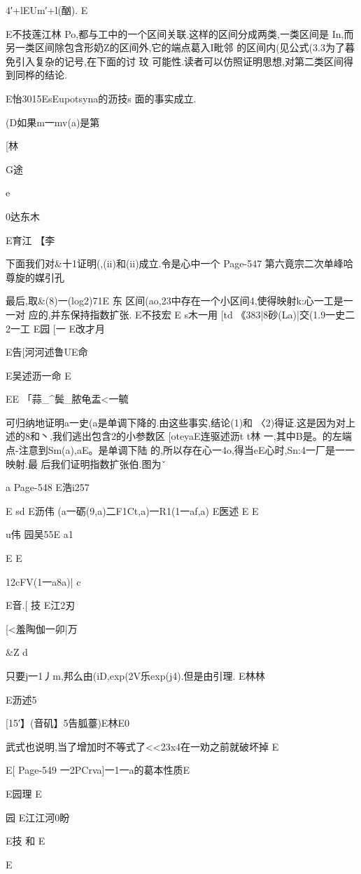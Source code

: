 {{4′+lEUm′+l(酗).
E

E不技莲江林
Po,都与工中的一个区间关联.这样的区间分成两类,一类区间是
In,而另一类区间除包含形奶Z的区间外,它的端点葛入I毗邻
的区间内(见公式(3.3为了暮免引入复杂的记号,在下面的讨
玟
可能性.读者可以仿照证明思想,对第二类区间得到同桦的结论.

E怡3015EsEupotsyna的沥技s
面的事实成立.

(D如果m一mv(a)是第%

[林

G途

e

0达东木

E育江
【李

下面我们对&十1证明(,(ii)和(ii)成立.令是心中一个
Page-547
第六竟宗二次单峰哈尊旋的媒引孔

最后,取&(8)一(log2)71E
东
区间(ao,23中存在一个小区间4,使得映射k:心一工是一一对
应的,并东保持指数扩张.
E不技宏
E
s木一用
[td
《383|8砂(La)|交(1.9一史二2一工
E园
[一
E改才月

E告[河河述鲁UE命

E吴述沥一命
E

EE
「蒜_^鬓_脓龟盂<一毓

可归纳地证明a一史(a是单调下降的.由这些事实,结论(1)和
〈2)得证.这是因为对上述的8和丶,我们逃出包含2的小参数区
[oteyaE连驱述沥t
t林
一,其中B是。的左端点-注意到Sm(a),aE。是单调下陆
的,所以存在心一4o,得当eE心时,Sn:4一厂是一一映射.最
后我们证明指数扩张伯.图为ˇ

a
Page-548
E浩i257

E
sd
E沥伟
(a一砺(9,a)二F1Ct,a)一R1(1一af,a)
E医述
E
E

u伟
园吴55E
a1

E
E

12cFV(1一a8a)|
c

E音.[
技
E江2刃

[<羞陶伽一卯|万

&Z
d

只要j一1丿m,邦么由(iD,exp(2V乐exp(j4).但是由引理.
E林林

E沥述5

[15′】(音矶】5告胍薹)E林E0

武式也说明,当了增加时不等式了<<23x4在一劝之前就破坏掉
E

E[
Page-549
一2PCrva]一1一a的葛本性质E

E园理
E

园
E江江河0盼

E技
和
E

E

}}
